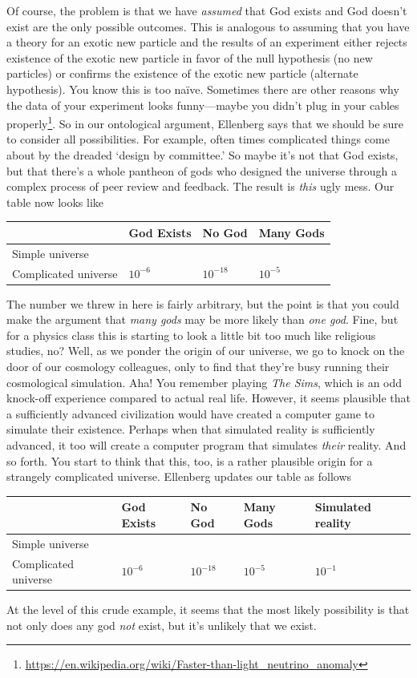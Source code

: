 Of course, the problem is that we have \emph{assumed} that God exists and God doesn't exist are the only possible outcomes. This is analogous to assuming that you have a theory for an exotic new particle and the results of an experiment either rejects existence of the exotic new particle in favor of the null hypothesis (no new particles) or confirms the existence of the exotic new particle (alternate hypothesis). You know this is too na\"ive. Sometimes there are other reasons why the data of your experiment looks funny---maybe you didn't plug in your cables properly\footnote{\url{https://en.wikipedia.org/wiki/Faster-than-light_neutrino_anomaly}}. So in our ontological argument, Ellenberg says that we should be sure to consider all possibilities. For example, often times complicated things come about by the dreaded `design by committee.' So maybe it's not that God exists, but that there's a whole pantheon of gods who designed the universe through a complex process of peer review and feedback. The result is \emph{this} ugly mess. Our table now looks like
\begin{center}
\begin{tabular}{l|lll} \toprule %
		& God Exists & No God & Many Gods
		\\ \hline
		Simple universe &  & &
		\\
		Complicated universe & $10^{-6}$  & $10^{-18}$ & $10^{-5}$
		\\ \bottomrule
\end{tabular}
\end{center}
The number we threw in here is fairly arbitrary, but the point is that you could make the argument that \emph{many gods} may be more likely than \emph{one god}. Fine, but for a physics class this is starting to look a little bit too much like religious studies, no? Well, as we ponder the origin of our universe, we go to knock on the door of our cosmology colleagues, only to find that they're busy running their cosmological simulation. Aha! You remember playing \emph{The Sims}, which is an odd knock-off experience compared to actual real life. However, it seems plausible that a sufficiently advanced civilization would have created a computer game to simulate their existence. Perhaps when that simulated reality is sufficiently advanced, it too will create a computer program that simulates \emph{their} reality. And so forth. You start to think that this, too, is a rather plausible origin for a strangely complicated universe. Ellenberg updates our table as follows
\begin{center}
\begin{tabular}{l|llll} \toprule %
		& God Exists & No God & Many Gods & Simulated reality
		\\ \hline
		Simple universe &  & & &
		\\
		Complicated universe & $10^{-6}$  & $10^{-18}$ & $10^{-5}$ & $10^{-1}$
		\\ \bottomrule
\end{tabular}
\end{center}
At the level of this crude example, it seems that the most likely possibility is that not only does any god \emph{not} exist, but it's unlikely that we exist. 

